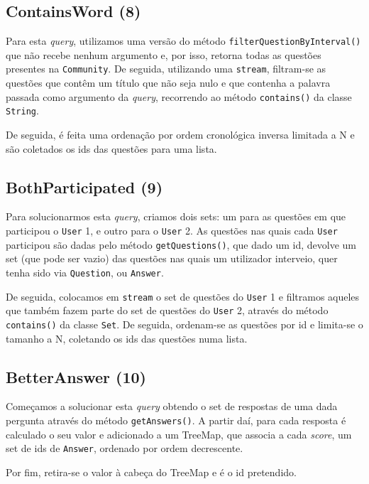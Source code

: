 \documentclass[a4paper]{article}
\begin{document}
	\subsection{ContainsWord (8)}
		\tab Para esta \textit{query}, utilizamos uma versão do método \texttt{filterQuestionByInterval()}
		que não recebe nenhum argumento e, por isso, retorna todas as questões presentes na
		\texttt{Community}. De seguida, utilizando uma \texttt{stream}, filtram-se as questões
		que contêm um título que não seja nulo e que contenha a palavra passada como argumento
		da \textit{query}, recorrendo ao método \texttt{contains()} da classe \texttt{String}.
		\par De seguida, é feita uma ordenação por ordem cronológica inversa limitada a N
		e são coletados os ids das questões para uma lista.


	\subsection{BothParticipated (9)}
		\tab Para solucionarmos esta \textit{query}, criamos dois sets: um para as questões
		em que participou o \texttt{User} 1, e outro para o \texttt{User} 2. As questões
		nas quais cada \texttt{User} participou são dadas pelo método \texttt{getQuestions()},
		que dado um id, devolve um set (que pode ser vazio) das questões nas quais um utilizador
		interveio, quer tenha sido via \texttt{Question}, ou \texttt{Answer}.
		\par De seguida, colocamos em \texttt{stream} o set de questões do \texttt{User} 1 e
		filtramos aqueles que também fazem parte do set de questões do \texttt{User} 2, através
		do método \texttt{contains()} da classe \texttt{Set}. De seguida, ordenam-se as questões
		por id e limita-se o tamanho a N, coletando os ids das questões numa lista.

	\subsection{BetterAnswer (10)}
		\tab Começamos a solucionar esta \textit{query} obtendo o set de respostas de uma
		dada pergunta através do método \texttt{getAnswers()}. A partir daí, para cada
		resposta é calculado o seu valor e adicionado a um TreeMap, que associa a cada
		\textit{score}, um set de ids de \texttt{Answer}, ordenado por ordem decrescente.
		\par Por fim, retira-se o valor à cabeça do TreeMap e é o id pretendido.
\end{document}
